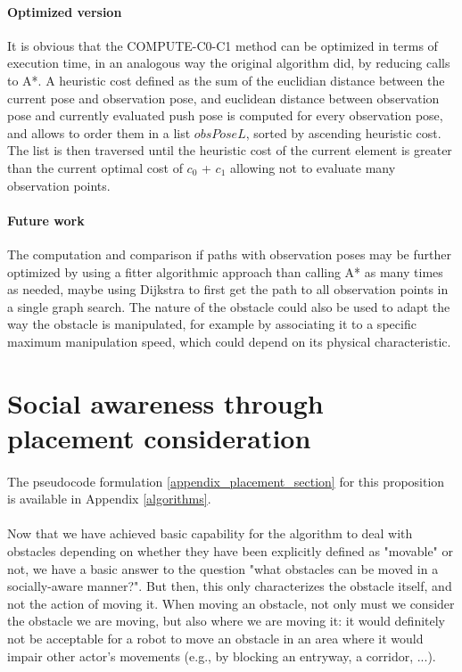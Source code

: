 \paragraph{Optimized version} It is obvious that the COMPUTE-C0-C1 method can be optimized in terms of execution time, in an analogous way the original algorithm did, by reducing calls to A*. A heuristic cost defined as the sum of the euclidian distance between the current pose and observation pose, and euclidean distance between observation pose and currently evaluated push pose is computed for every observation pose, and allows to order them in a list $obsPoseL$, sorted by ascending heuristic cost. The list is then traversed until the heuristic cost of the current element is greater than the current optimal cost of $c_{0}$ + $c_{1}$ allowing not to evaluate many observation points.

\paragraph{Future work} The computation and comparison if paths with observation poses may be further optimized by using a fitter algorithmic approach than calling A* as many times as needed, maybe using Dijkstra to first get the path to all observation points in a single graph search. The nature of the obstacle could also be used to adapt the way the obstacle is manipulated, for example by associating it to a specific maximum manipulation speed, which could depend on its physical characteristic.

\section{Social awareness through placement consideration}\label{social_appendix_placement_section}

\paragraph{} The pseudocode formulation \ref{appendix_placement_section} for this proposition is available in Appendix \ref{algorithms}.

\paragraph{} Now that we have achieved basic capability for the algorithm to deal with obstacles depending on whether they have been explicitly defined as "movable" or not, we have a basic answer to the question "what obstacles can be moved in a socially-aware manner?". But then, this only characterizes the obstacle itself, and not the action of moving it. When moving an obstacle, not only must we consider the obstacle we are moving, but also where we are moving it: it would definitely not be acceptable for a robot to move an obstacle in an area where it would impair other actor's movements (e.g., by blocking an entryway, a corridor, ...).

